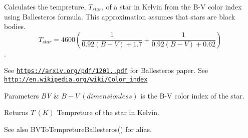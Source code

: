 Calculates the tempreture, $T_{star}$, of a star in Kelvin from the B-\/V color index using Ballesteros\textquotesingle{} formula. This approximation assumes that stars are black bodies. \[T_{star}=4600 \left ( \frac{1}{0.92 (B-V)+ 1.7} + \frac{1}{0.92 (B-V) + 0.62} \right )\]. 

See \href{https://arxiv.org/pdf/1201.1809.pdf}{\tt https\+://arxiv.\+org/pdf/1201..\+pdf} for Ballesteros\textquotesingle{} paper. See \href{http://en.wikipedia.org/wiki/Color_index}{\tt http\+://en.\+wikipedia.\+org/wiki/\+Color\+\_\+index}


\begin{DoxyParams}{Parameters}
{\em BV} & $B-V\ (dimensionless)$ is the B-\/V color index of the star. \\
\hline
\end{DoxyParams}
\begin{DoxyReturn}{Returns}
$T\ (K)$ Tempreture of the star in Kelvin. 
\end{DoxyReturn}
\begin{DoxySeeAlso}{See also}
B\+V\+To\+Tempreture\+Ballesteros() for alias. 
\end{DoxySeeAlso}
